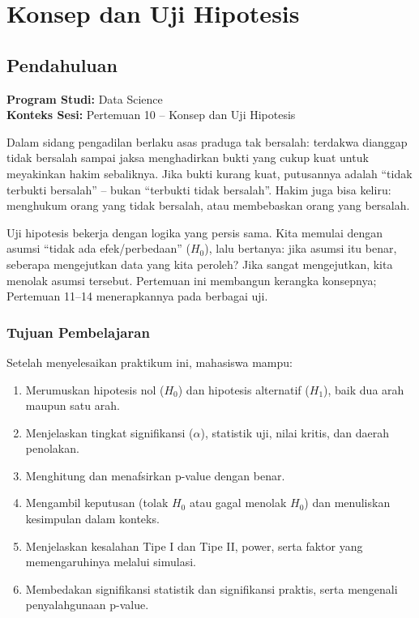 \documentclass[
  indonesian,
  letterpaper,
]{book}
\providecommand{\tightlist}{%
  \setlength{\itemsep}{0pt}\setlength{\parskip}{0pt}}
\begin{document}

\chapter{Konsep dan Uji Hipotesis}\label{konsep-dan-uji-hipotesis}

\section{Pendahuluan}\label{pendahuluan-1}

\textbf{Program Studi:} Data Science\\
\textbf{Konteks Sesi:} Pertemuan 10 -- Konsep dan Uji Hipotesis

Dalam sidang pengadilan berlaku asas praduga tak bersalah: terdakwa
dianggap tidak bersalah sampai jaksa menghadirkan bukti yang cukup kuat
untuk meyakinkan hakim sebaliknya. Jika bukti kurang kuat, putusannya
adalah ``tidak terbukti bersalah'' -- bukan ``terbukti tidak bersalah''.
Hakim juga bisa keliru: menghukum orang yang tidak bersalah, atau
membebaskan orang yang bersalah.

Uji hipotesis bekerja dengan logika yang persis sama. Kita memulai
dengan asumsi ``tidak ada efek/perbedaan'' (\(H_0\)), lalu bertanya:
jika asumsi itu benar, seberapa mengejutkan data yang kita peroleh? Jika
sangat mengejutkan, kita menolak asumsi tersebut. Pertemuan ini
membangun kerangka konsepnya; Pertemuan 11--14 menerapkannya pada
berbagai uji.

\subsection{Tujuan Pembelajaran}\label{tujuan-pembelajaran-1}

Setelah menyelesaikan praktikum ini, mahasiswa mampu:

\begin{enumerate}
\def\labelenumi{\arabic{enumi}.}
\tightlist
\item
  Merumuskan hipotesis nol (\(H_0\)) dan hipotesis alternatif (\(H_1\)),
  baik dua arah maupun satu arah.
\item
  Menjelaskan tingkat signifikansi (\(\alpha\)), statistik uji, nilai
  kritis, dan daerah penolakan.
\item
  Menghitung dan menafsirkan p-value dengan benar.
\item
  Mengambil keputusan (tolak \(H_0\) atau gagal menolak \(H_0\)) dan
  menuliskan kesimpulan dalam konteks.
\item
  Menjelaskan kesalahan Tipe I dan Tipe II, power, serta faktor yang
  memengaruhinya melalui simulasi.
\item
  Membedakan signifikansi statistik dan signifikansi praktis, serta
  mengenali penyalahgunaan p-value.
\end{enumerate}
\end{document}
